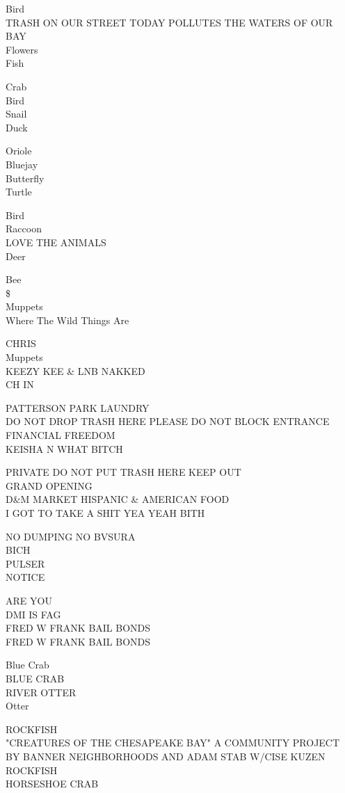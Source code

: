 \documentclass[10pt,letterpaper]{article}
\begin{document}
Bird\\
TRASH ON OUR STREET TODAY POLLUTES THE WATERS OF OUR BAY\\
Flowers\\
Fish

Crab\\
Bird\\
Snail\\
Duck

Oriole\\
Bluejay\\
Butterfly\\
Turtle

Bird\\
Raccoon\\
LOVE THE ANIMALS\\
Deer

Bee\\
\$\\
Muppets\\
Where The Wild Things Are

CHRIS\\
Muppets\\
KEEZY KEE \& LNB NAKKED\\
CH IN

PATTERSON PARK LAUNDRY\\
DO NOT DROP TRASH HERE PLEASE DO NOT BLOCK ENTRANCE\\
FINANCIAL FREEDOM\\
KEISHA N WHAT BITCH

PRIVATE DO NOT PUT TRASH HERE KEEP OUT\\
GRAND OPENING\\
D\&M MARKET HISPANIC \& AMERICAN FOOD\\
I GOT TO TAKE A SHIT YEA YEAH BITH

NO DUMPING NO BVSURA\\
BICH\\
PULSER\\
NOTICE

ARE YOU\\
DMI IS FAG\\
FRED W FRANK BAIL BONDS\\
FRED W FRANK BAIL BONDS

Blue Crab\\
BLUE CRAB\\
RIVER OTTER\\
Otter

ROCKFISH\\
"CREATURES OF THE CHESAPEAKE BAY" A COMMUNITY PROJECT BY BANNER NEIGHBORHOODS AND ADAM STAB W/CISE KUZEN\\
ROCKFISH\\
HORSESHOE CRAB
\end{document}
